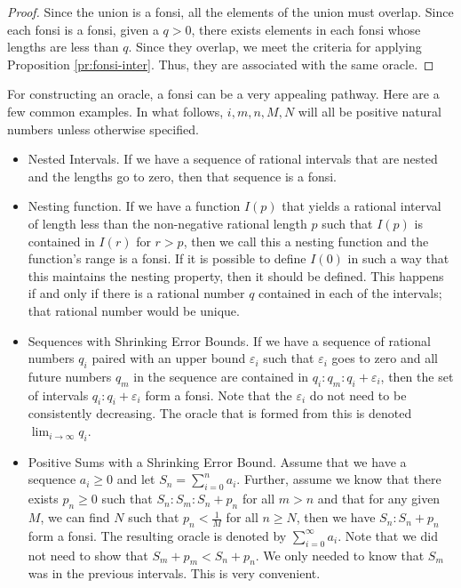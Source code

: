\documentclass[12pt]{article}
\begin{document}
\begin{proof}
    Since the union is a fonsi, all the elements of the union must overlap. Since each fonsi is a fonsi, given a $q > 0$, there exists elements in each fonsi whose lengths are less than $q$. Since they overlap, we meet the criteria for applying Proposition \ref{pr:fonsi-inter}. Thus, they are associated with the same oracle. 
\end{proof}

For constructing an oracle, a fonsi can be a very appealing pathway.  Here are a few common examples. In what follows, $i, m, n, M, N$ will all be positive natural numbers unless otherwise specified.

\begin{itemize}
    \item Nested Intervals. If we have a sequence of rational intervals that are nested and the lengths go to zero, then that sequence is a fonsi.
    \item Nesting function. If we have a function $I(p)$ that yields a rational interval of length less than the non-negative rational length $p$ such that $I(p)$ is contained in $I(r)$ for $r>p$, then we call this a nesting function and the function's range is a fonsi. If it is possible to define $I(0)$ in such a way that this maintains the nesting property, then it should be defined. This happens if and only if there is a rational number $q$ contained in each of the intervals; that rational number would be unique. 
    
    \item Sequences with Shrinking Error Bounds. If we have a sequence of rational numbers $q_i$ paired with an upper bound $\varepsilon_i$ such that $\varepsilon_i$ goes to zero and all future numbers $q_m$ in the sequence are contained in $q_i:q_m:q_i+\varepsilon_i$, then the set of intervals $q_i:q_i+\varepsilon_i$ form a fonsi. Note that the $\varepsilon_i$ do not need to be consistently decreasing. The oracle that is formed from this is denoted $\lim_{i \to \infty} q_i $. 
    
    \item Positive Sums with a Shrinking Error Bound. Assume that we have a sequence $a_i\geq 0$ and let $S_n = \sum_{i=0}^n a_i$. Further, assume we know that there exists $p_n \geq 0$ such that $S_n: S_m : S_n + p_n$ for all $m > n$ and that for any given $M$, we can find $N$ such that $p_n < \frac{1}{M}$ for all $n \geq N$, then we have $S_n: S_n + p_n$ form a fonsi. The resulting oracle is denoted by $\sum_{i=0}^\infty a_i$. Note that we did not need to show that $S_m+p_m < S_n + p_n$. We only needed to know that $S_m$ was in the previous intervals. This is very convenient.
    

\end{itemize}
\end{document}
